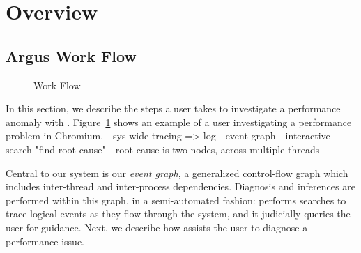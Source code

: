 \section{Overview}\label{sec:overview}

\subsection{Argus Work Flow}
\begin{figure}[tb]
    \centering
	
    \caption{\xxx Work Flow}
    \label{fig:argus-overview}
\end{figure}
In this section, we describe the steps a user takes to investigate a performance
anomaly with \xxx. Figure~\ref{fig:argus-overview} shows an example of a user
investigating a performance problem in Chromium.
- sys-wide tracing => log
- event graph
- interactive search "find root cause"
- root cause is two nodes, across multiple threads


%
%

Central to our system is our \emph{event graph}, a generalized control-flow
graph which includes inter-thread and inter-process dependencies. Diagnosis
and inferences are performed within this graph, in a semi-automated fashion:
\xxx performs searches to trace logical events as they
flow through the system, and it judicially queries the user for guidance.
Next, we describe how \xxx assists the user to diagnose a performance issue.


